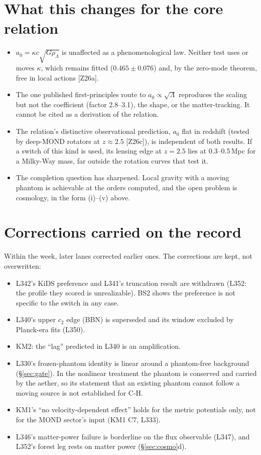 \documentclass[10pt]{article}
\begin{document}
\section{What this changes for the core relation}\label{sec:core}
\begin{itemize}
\item $a_0=\kappa c\sqrt{G\rho_\Lambda}$ is unaffected as a phenomenological law. Neither test uses or moves $\kappa$, which remains fitted ($0.465\pm0.076$) and, by the zero-mode theorem, free in local actions [Z26a].
\item The one published first-principles route to $a_0\propto\sqrt\Lambda$ reproduces the scaling but not the coefficient (factor 2.8--3.1), the shape, or the matter-tracking. It cannot be cited as a derivation of the relation.
\item The relation's distinctive observational prediction, $a_0$ flat in redshift (tested by deep-MOND rotators at $z\approx2.5$ [Z26c]), is independent of both results. If a switch of this kind is used, its lensing edge at $z=2.5$ lies at 0.3--0.5\,Mpc for a Milky-Way mass, far outside the rotation curves that test it.
\item The completion question has sharpened. Local gravity with a moving phantom is achievable at the orders computed, and the open problem is cosmology, in the form (i)--(v) above.
\end{itemize}

\section{Corrections carried on the record}
Within the week, later lanes corrected earlier ones. The corrections are kept, not overwritten:
\begin{itemize}
\item L342's KiDS preference and L341's truncation result are withdrawn (L352: the profile they scored is unrealizable). BS2 shows the preference is not specific to the switch in any case.
\item L340's upper $c_2$ edge (BBN) is superseded and its window excluded by Planck-era fits (L350).
\item KM2: the ``lag'' predicted in L340 is an amplification.
\item L330's frozen-phantom identity is linear around a phantom-free background (\S\ref{sec:gate}). In the nonlinear treatment the phantom is conserved and carried by the aether, so its statement that an existing phantom cannot follow a moving source is not established for C-H.
\item KM1's ``no velocity-dependent effect'' holds for the metric potentials only, not for the MOND sector's input (KM1 C7, L333).
\item L346's matter-power failure is borderline on the flux observable (L347), and L352's forest leg rests on matter power (\S\ref{sec:cosmo}d).
\end{itemize}
\end{document}
